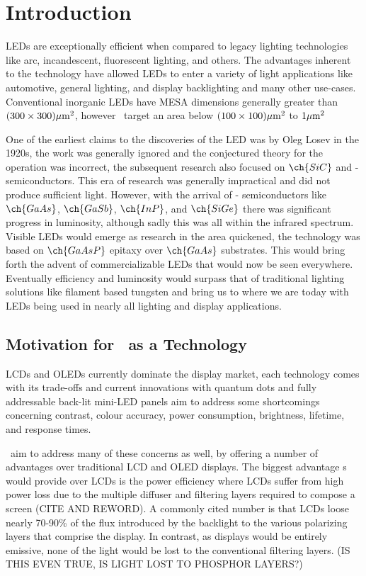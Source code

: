 \chapter{Introduction}

LEDs are exceptionally efficient when compared to legacy lighting technologies like arc, incandescent, fluorescent lighting, and others. The advantages inherent to the technology have allowed LEDs to enter a variety of light applications like automotive, general lighting, and display backlighting and many other use-cases. \cite{uLED_review}
Conventional inorganic LEDs have MESA dimensions generally greater than $(300\times 300) \umm$, however \uleds \ target an area below $(100\times 100) \umm$ to $1 \umm$ \cite{parbrook2021micro}

One of the earliest claims to the discoveries of the LED was by Oleg Losev in the 1920s, the work was generally ignored and the conjectured theory for the operation was incorrect, the subsequent research also focused on $\ch{SiC}$ and - semiconductors. This era of research was generally impractical and did not produce sufficient light. However, with the arrival of - semiconductors like $\ch{GaAs}$, $\ch{GaSb}$, $\ch{InP}$, and $\ch{SiGe}$ there was significant progress in luminosity, although sadly this was all within the infrared spectrum.
Visible LEDs would emerge as research in the area quickened, the technology was based on $\ch{GaAsP}$ epitaxy over $\ch{GaAs}$ substrates. This would bring forth the advent of commercializable LEDs that would now be seen everywhere. Eventually efficiency and luminosity would surpass that of traditional lighting solutions like filament based tungsten and bring us to where we are today with LEDs being used in nearly all lighting and display applications.




\section{Motivation for \uleds \ as a Technology}
LCDs and OLEDs currently dominate the display market, each technology comes with its trade-offs and current innovations with quantum dots and fully addressable back-lit mini-LED panels aim to address some shortcomings concerning contrast, colour accuracy, power consumption, brightness, lifetime, and response times.

\uleds \ aim to address many of these concerns as well, by offering a number of advantages over traditional LCD and OLED displays. The biggest advantage \uled s would provide over LCDs is the power efficiency where LCDs suffer from high power loss due to the multiple diffuser and filtering layers required to compose a screen (CITE AND REWORD). A commonly cited number is that LCDs loose nearly 70-90\% of the flux introduced by the backlight to the various polarizing layers that comprise the display. In contrast, as \uled  displays would be entirely emissive, none of the light would be lost to the conventional filtering layers. (IS THIS EVEN TRUE, IS LIGHT LOST TO PHOSPHOR LAYERS?)


